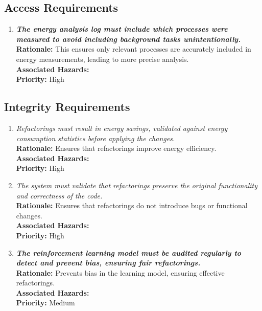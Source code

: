\documentclass{article}
\begin{document}
\subsection{Access Requirements}
\begin{enumerate}[label=SR-AP \arabic*., wide=0pt, leftmargin=*]
    \item \emph{\textbf{The energy analysis log must include which processes were measured to avoid including background tasks unintentionally.}}\\[2mm]
    \textbf{Rationale:} This ensures only relevant processes are accurately included in energy measurements, leading to more precise analysis.\\
    \textbf{Associated Hazards:} \\
    \textbf{Priority:} High
\end{enumerate}

\subsection{Integrity Requirements}
\begin{enumerate}[label=SR-IN \arabic*., wide=0pt, leftmargin=*]
    \item \emph{Refactorings must result in energy savings, validated against energy consumption statistics before applying the changes.}\\[2mm]
    {\bf Rationale:} Ensures that refactorings improve energy efficiency.\\
    {\bf Associated Hazards:} \\
    {\bf Priority:} High
    \item \emph{The system must validate that refactorings preserve the original functionality and correctness of the code.}\\[2mm]
    {\bf Rationale:} Ensures that refactorings do not introduce bugs or functional changes.\\
    {\bf Associated Hazards:} \\
    {\bf Priority:} High
    \item \emph{\textbf{The reinforcement learning model must be audited regularly to detect and prevent bias, ensuring fair refactorings.}}\\[2mm]
    {\bf Rationale:} Prevents bias in the learning model, ensuring effective refactorings.\\
    {\bf Associated Hazards:} \\
    {\bf Priority:} Medium
\end{enumerate}
\end{document}
